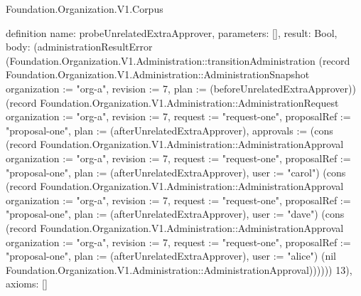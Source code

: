 \begin{lexlean}{Foundation.Organization.V1.Corpus}
\begin{semanticmodule}
definition{
  name: probeUnrelatedExtraApprover,
  parameters: [],
  result: Bool,
  body: (administrationResultError (Foundation.Organization.V1.Administration::transitionAdministration (record Foundation.Organization.V1.Administration::AdministrationSnapshot {organization := "org-a", revision := 7, plan := (beforeUnrelatedExtraApprover)}) (record Foundation.Organization.V1.Administration::AdministrationRequest {organization := "org-a", revision := 7, request := "request-one", proposalRef := "proposal-one", plan := (afterUnrelatedExtraApprover), approvals := (cons (record Foundation.Organization.V1.Administration::AdministrationApproval {organization := "org-a", revision := 7, request := "request-one", proposalRef := "proposal-one", plan := (afterUnrelatedExtraApprover), user := "carol"}) (cons (record Foundation.Organization.V1.Administration::AdministrationApproval {organization := "org-a", revision := 7, request := "request-one", proposalRef := "proposal-one", plan := (afterUnrelatedExtraApprover), user := "dave"}) (cons (record Foundation.Organization.V1.Administration::AdministrationApproval {organization := "org-a", revision := 7, request := "request-one", proposalRef := "proposal-one", plan := (afterUnrelatedExtraApprover), user := "alice"}) (nil Foundation.Organization.V1.Administration::AdministrationApproval))))})) 13),
  axioms: []
}


\end{semanticmodule}
\end{lexlean}
